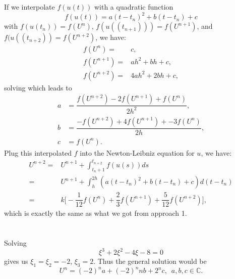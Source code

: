 \documentclass[11pt]{article}
\begin{document}
\subsection{}
If we interpolate $f(u(t))$ with a quadratic function
\begin{equation}
    f(u(t)) = a(t-t_n)^2 + b(t-t_n) + c
\end{equation} 
with $f(u(t_n))=f(U^n)$, $f(u((t_{n+1}))) = f(U^{n+1})$, and 
$f(u((t_{n+2})) = f(U^{n+2})$, we have:
\begin{equation}\begin{split}
    f(U^n) =& c,\\
    f(U^{n+1}) =& ah^2 + bh + c,\\
    f(U^{n+2}) =& 4ah^2 + 2bh + c,
\end{split}\end{equation}
solving which leads to
\begin{equation}\begin{split}
    a &= \dfrac{f(U^{n+2}) - 2f(U^{n+1}) + f(U^n)}{2h^2},\\
    b &= \dfrac{-f(U^{n+2}) + 4f(U^{n+1}) + -3f(U^n)}{2h},\\
    c &= f(U^n).
\end{split}\end{equation} 
Plug this interpolated $f$ into the Newton-Leibniz equation for $u$, we have:
\begin{equation}\begin{split}
    U^{n+2}=&U^{n+1}+\int_{t_n+1}^{t_{n+2}}f(u(s))ds\\
           =&U^{n+1}+\int_h^{2h}(a(t-t_n)^2+b(t-t_n)+c)d(t-t_n)\\
           =&k\Big[-\dfrac1{12}f(U^{n}) + \dfrac23f(U^{n+1}) + \dfrac5{12}f(U^{n+2})\Big],
\end{split}\end{equation}
which is exactly the same as what we got from approach 1.

\pagebreak
\section{}
\subsection{}
Solving
\begin{equation}
    \xi^3+2\xi^2-4\xi-8 = 0
\end{equation} 
gives us $\xi_1=\xi_2=-2$, $\xi_3=2$. Thus the general solution would be
\begin{equation}
    U^n = (-2)^na + (-2)^nnb + 2^nc,\,\,\,a, b,c \in \mathbb{C}.
\end{equation} 
\end{document}
